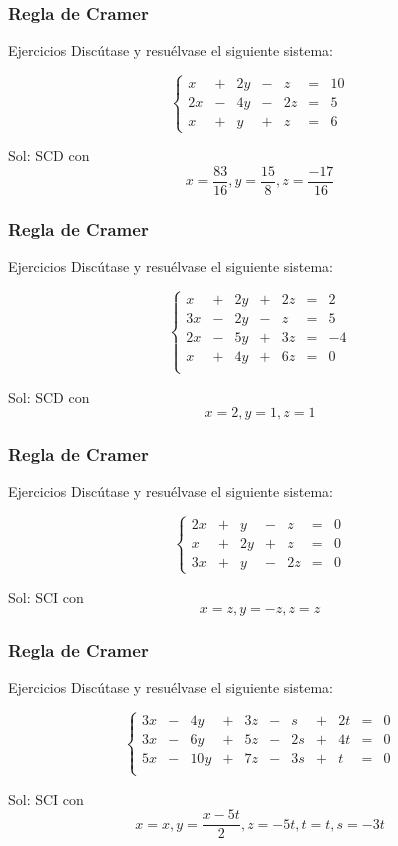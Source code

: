 \documentclass[12pt]{article}
\begin{document}
         \begin{frame}
  \frametitle{Regla de Cramer}
     \begin{block}{Ejercicios}
Disc\'utase y resu\'elvase el siguiente sistema:

\[
\left\{\begin{array}{ccccccc}x & + & 2y & - & z & = & 10 \\
2x & - & 4y & -  & 2z  & = & 5 \\
x & + & y & +& z & = & 6\end{array}\right.
\]
\end{block}
Sol: SCD con
\[x=\frac{83}{16}, y=\frac{15}{8}, z=\frac{-17}{16}\]
\end{frame} 


         \begin{frame}
  \frametitle{Regla de Cramer}
     \begin{block}{Ejercicios}
Disc\'utase y resu\'elvase el siguiente sistema:

\[
\left\{\begin{array}{ccccccc}
x & + & 2y & + &2z & = & 2\\
3x & - & 2y & -  & z  & = & 5 \\
2x & - & 5y & +& 3z & = & -4\\
x &+ & 4y & +  & 6z  & = & 0 \\
\end{array}\right.
\]
\end{block}
Sol: SCD con
\[x=2, y=1, z=1\]
\end{frame} 





         \begin{frame}
  \frametitle{Regla de Cramer}
     \begin{block}{Ejercicios}
Disc\'utase y resu\'elvase el siguiente sistema:

\[
\left\{\begin{array}{ccccccc}
2x & + & y & - &z & = & 0\\
x & +& 2y & +  & z  & = & 0 \\
3x & + & y & -& 2z & = & 0
\end{array}\right.
\]
\end{block}
Sol: SCI con
\[x=z, y=-z, z=z\]
\end{frame} 






         \begin{frame}
  \frametitle{Regla de Cramer}
     \begin{block}{Ejercicios}
Disc\'utase y resu\'elvase el siguiente sistema:

\[
\left\{\begin{array}{ccccccccccc}
3x & - & 4y & + &3z & -&s&+&2t &= & 0\\
3x & - & 6y & + &5z & -&2s&+&4t &= & 0\\
5x & - & 10y & + &7z & -&3s&+&t &= & 0\\
\end{array}\right.
\]
\end{block}
Sol: SCI con
\[x=x, y=\frac{x-5t}{2}, z=-5t, t=t, s=-3t\]
\end{frame} 
\end{document}
